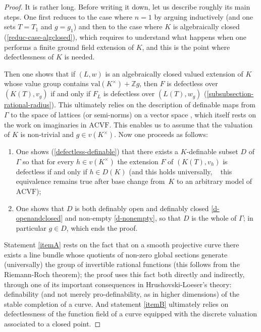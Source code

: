 \documentclass[JEP,XML,SOM,Unicode,ThmDefs,NoEqCountersInSection,published]{cedram}
\newcommand{\val}{\mathrm{val}}
\newcommand{\acvf}{\mathrm{ACVF}}
\newcommand{\Z}{\mathbb Z}
\theoremstyle{plain}
\theoremstyle{definition}
\begin{document}
\begin{proof}
It is rather long.
Before writing it down, let us describe roughly its main steps.
One first reduces to the case where $n=1$ by arguing inductively
(and one sets $T=T_1$ and $g=g_1$) and then to the case
where $K$ is algebraically closed (\ref{reduc-case-algclosed}), which
requires to understand what happens
when one performs a finite ground field extension of $K$, and this is the point where defectlessness of $K$ is needed.

Then one shows that if $(L,w)$ is an algebraically closed valued extension of $K$ whose value group
contains $\val(K^\times)+\Z g$, then $F$ is defectless over $(K(T),v_g)$ if and only if $F_L$
is defectless over $(L(T), w_g)$ (\ref{subsubsection-rational-radius}). This ultimately relies on the description
of definable maps from $\Gamma$ to the space of lattices (or semi-norms) on a vector space \cite[Lem.\,6.2.2]{HL}, which itself rests on the
work \cite{haskell-h-m2006}
on
imaginaries in $\acvf$. This enables us to assume that the valuation of $K$ is non-trivial and $g\in v(K^\times)$.
Now one proceeds as follows:

\begin{enumerate}\renewcommand{\theenumi}{\Alph{enumi}}
\item\label{itemA}
One shows (\ref{defectless-definable})
that there exists a $K$-definable subset $D$ of $\Gamma$ so that for every $h\in v(K^\times)$
the extension $F$ of $(K(T),v_h)$ is defectless if and only if $h\in D(K)$ (and this holds universally, \ie~
this equivalence remains true after base change from~$K$ to an arbitrary model of $\acvf$);

\item\label{itemB}
One shows that $D$ is both definably open and definably closed
\eqref{d-openandclosed} and non-empty \eqref{d-nonempty},
so that $D$
is the whole of $\Gamma$; in particular $g\in D$, which ends the proof.
\end{enumerate}

Statement \eqref{itemA} rests on the fact that on a smooth projective curve there exists a line bundle whose quotients
of non-zero global sections generate (universally) the group of invertible rational functions (this follows from the
Riemann-Roch theorem); the proof uses this fact both directly and indirectly, through one
of its important consequences in Hrushovski-Loeser's theory:
definability (and not merely pro-definability, as in higher dimensions) of the stable completion of a curve.
And statement \eqref{itemB} ultimately relies on defectlessness of the function field of a curve equipped with the discrete valuation associated
to a closed point.


\end{proof}
\end{document}

